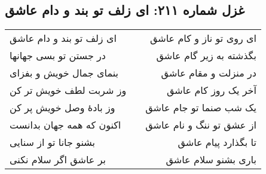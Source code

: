 \begin{center}
\section*{غزل شماره ۲۱۱: ای زلف تو بند و دام عاشق}
\label{sec:211}
\begin{longtable}{l p{0.5cm} r}
ای زلف تو بند و دام عاشق
&&
ای روی تو ناز و کام عاشق
\\
در جستن تو بسی جهانها
&&
بگذشته به زیر گام عاشق
\\
بنمای جمال خویش و بفزای
&&
در منزلت و مقام عاشق
\\
وز شربت لطف خویش تر کن
&&
آخر یک روز کام عاشق
\\
وز بادهٔ وصل خویش پر کن
&&
یک شب صنما تو جام عاشق
\\
اکنون که همه جهان بدانست
&&
از عشق تو ننگ و نام عاشق
\\
بشنو جانا تو از سنایی
&&
تا بگذارد پیام عاشق
\\
بر عاشق اگر سلام نکنی
&&
باری بشنو سلام عاشق
\\
\end{longtable}
\end{center}
